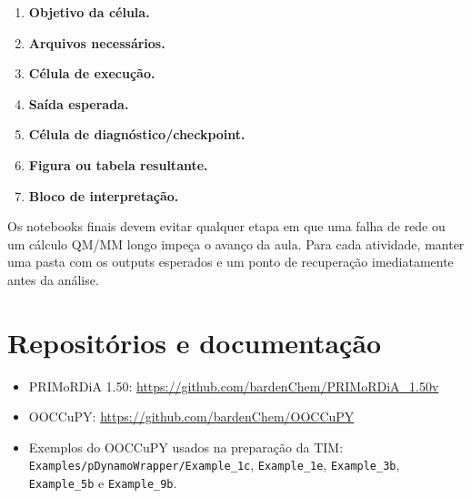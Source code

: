 \documentclass[a4paper,11pt]{refart}
\newcommand{\code}[1]{\texttt{#1}}
\begin{document}
\begin{enumerate}
    \item \textbf{Objetivo da célula.}
    \item \textbf{Arquivos necessários.}
    \item \textbf{Célula de execução.}
    \item \textbf{Saída esperada.}
    \item \textbf{Célula de diagnóstico/checkpoint.}
    \item \textbf{Figura ou tabela resultante.}
    \item \textbf{Bloco de interpretação.}
\end{enumerate}

\begin{comentariobox}
Os notebooks finais devem evitar qualquer etapa em que uma falha de rede ou um cálculo QM/MM longo impeça o avanço da aula. Para cada atividade, manter uma pasta com os outputs esperados e um ponto de recuperação imediatamente antes da análise.
\end{comentariobox}

\section*{Repositórios e documentação}

\begin{itemize}
    \item PRIMoRDiA 1.50: \url{https://github.com/bardenChem/PRIMoRDiA_1.50v}
    \item OOCCuPY: \url{https://github.com/bardenChem/OOCCuPY}
    \item Exemplos do OOCCuPY usados na preparação da TIM: \code{Examples/pDynamoWrapper/Example\_1c}, \code{Example\_1e}, \code{Example\_3b}, \code{Example\_5b} e \code{Example\_9b}.
\end{itemize}
\end{document}
